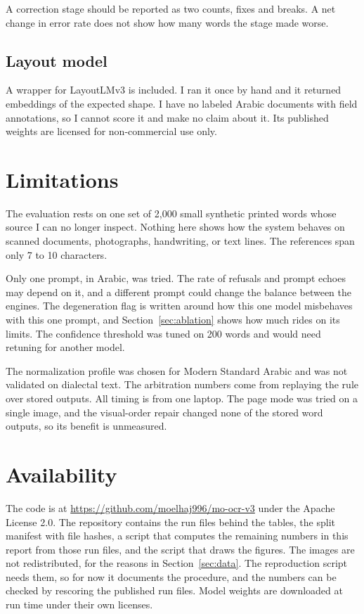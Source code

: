 \documentclass[11pt,a4paper]{article}
\begin{document}
A correction stage should be reported as two counts, fixes and breaks. A net
change in error rate does not show how many words the stage made worse.

\subsection{Layout model}

A wrapper for LayoutLMv3 \cite{layoutlmv3} is included. I ran it once by hand
and it returned embeddings of the expected shape. I have no labeled Arabic
documents with field annotations, so I cannot score it and make no claim
about it. Its published weights are licensed for non-commercial use only.

\section{Limitations}

The evaluation rests on one set of 2,000 small synthetic printed words whose
source I can no longer inspect. Nothing here shows how the system behaves on
scanned documents, photographs, handwriting, or text lines. The references
span only 7 to 10 characters.

Only one prompt, in Arabic, was tried. The rate of refusals and prompt echoes
may depend on it, and a different prompt could change the balance between the
engines. The degeneration flag is written around how this one model
misbehaves with this one prompt, and Section~\ref{sec:ablation} shows how
much rides on its limits. The confidence threshold was tuned on 200 words and
would need retuning for another model.

The normalization profile was chosen for Modern Standard Arabic and was not
validated on dialectal text. The arbitration numbers come from replaying the
rule over stored outputs. All timing is from one
laptop. The page mode was tried on a single image, and the visual-order repair
changed none of the stored word outputs, so its benefit is unmeasured.

\section{Availability}

The code is at \url{https://github.com/moelhaj996/mo-ocr-v3} under the Apache
License 2.0. The repository contains the run files behind the tables, the
split manifest with file hashes, a script that computes the remaining numbers
in this report from those run files, and the script that draws the figures.
The images are not redistributed, for the reasons in Section~\ref{sec:data}.
The reproduction script needs them, so for now it documents the procedure,
and the numbers can be checked by rescoring the published run files. Model
weights are downloaded at run time under their own licenses.
\end{document}
